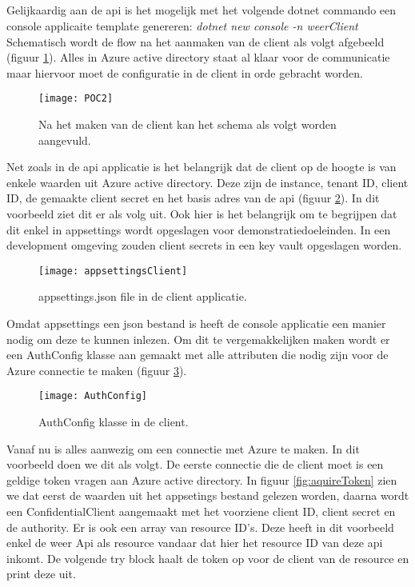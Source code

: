 \subsection{}
Gelijkaardig aan de api is het mogelijk met het volgende dotnet commando een console applicaite template genereren: \emph{dotnet new console -n weerClient}\newline
Schematisch wordt de flow na het aanmaken van de client als volgt afgebeeld (figuur \ref{fig:poc2}). Alles in Azure active directory staat al klaar voor de communicatie maar hiervoor moet de configuratie in de client in orde gebracht worden.
\begin{figure}[H]
	\centering
	\texttt{[image: POC2]} 
	\caption[POC2]{Na het maken van de client kan het schema als volgt worden aangevuld.}
	\label{fig:poc2}
\end{figure}
Net zoals in de api applicatie is het belangrijk dat de client op de hoogte is van enkele waarden uit Azure active directory. Deze zijn de instance, tenant ID, client ID, de gemaakte client secret en het basis adres van de api (figuur \ref{fig:appsettingsClient}). In dit voorbeeld ziet dit er als volg uit. Ook hier is het belangrijk om te begrijpen dat dit enkel in appsettings wordt opgeslagen voor demonstratiedoeleinden. In een development omgeving zouden client secrets in een key vault opgeslagen worden.
\begin{figure}[H]
	\centering
	\texttt{[image: appsettingsClient]} 
	\caption[POC2]{appsettings.json file in de client applicatie.}
	\label{fig:appsettingsClient}
\end{figure}
Omdat appsettings een json bestand is heeft de console applicatie een manier nodig om deze te kunnen inlezen. Om dit te vergemakkelijken maken wordt er een AuthConfig klasse aan gemaakt met alle attributen die nodig zijn voor de Azure connectie te maken (figuur \ref{fig:authConfig}).
\begin{figure}[H]
	\centering
	\texttt{[image: AuthConfig]} 
	\caption[AuthConfig]{AuthConfig klasse in de client.}
	\label{fig:authConfig}
\end{figure}\newpage
Vanaf nu is alles aanwezig om een connectie met Azure te maken. In dit voorbeeld doen we dit als volgt. De eerste connectie die de client moet is een geldige token vragen aan Azure active directory. In figuur \ref{fig:aquireToken} zien we dat eerst de waarden uit het appsetings bestand gelezen worden, daarna wordt een ConfidentialClient aangemaakt met het voorziene client ID, client secret en de authority. Er is ook een array van resource ID’s. Deze heeft in dit voorbeeld enkel de weer Api als resource vandaar dat hier het resource ID van deze api inkomt. De volgende try block haalt de token op voor de client van de resource en print deze uit.
